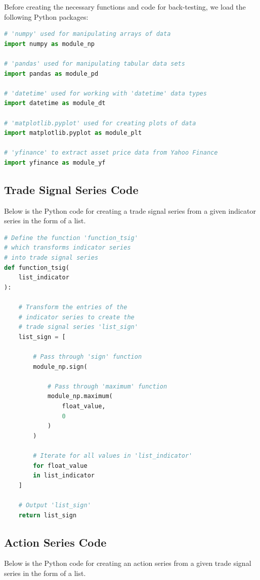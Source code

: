 \documentclass[11pt]{article}
\begin{document}
Before creating the necessary functions and code for back-testing, we load the following Python packages:

\begin{lstlisting}[language=Python]
# 'numpy' used for manipulating arrays of data
import numpy as module_np

# 'pandas' used for manipulating tabular data sets
import pandas as module_pd

# 'datetime' used for working with 'datetime' data types
import datetime as module_dt

# 'matplotlib.pyplot' used for creating plots of data
import matplotlib.pyplot as module_plt

# 'yfinance' to extract asset price data from Yahoo Finance
import yfinance as module_yf
\end{lstlisting}


\subsection{Trade Signal Series Code}

Below is the Python code for creating a trade signal series from a given indicator series in the form of a list.

\begin{lstlisting}[language=Python]
# Define the function 'function_tsig'
# which transforms indicator series
# into trade signal series
def function_tsig(
    list_indicator
):

    # Transform the entries of the
    # indicator series to create the
    # trade signal series 'list_sign'
    list_sign = [

        # Pass through 'sign' function
        module_np.sign(

            # Pass through 'maximum' function
            module_np.maximum(
                float_value,
                0
            )
        )

        # Iterate for all values in 'list_indicator'
        for float_value
        in list_indicator
    ]

    # Output 'list_sign'
    return list_sign
\end{lstlisting}

\subsection{Action Series Code}

Below is the Python code for creating an action series from a given trade signal series in the form of a list.
\end{document}
